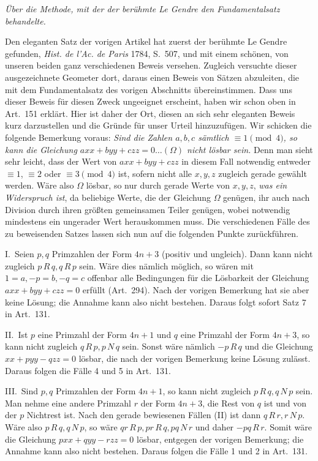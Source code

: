 \begin{center}\itshape Über die Methode, mit der der berühmte Le Gendre den Fundamentalsatz behandelte.\end{center}
Den eleganten Satz der vorigen Artikel hat zuerst der
berühmte Le Gendre gefunden, \emph{Hist. de l'Ac. de Paris}
1784, S.\ 507, und mit einem schönen, von unseren beiden
ganz verschiedenen Beweis versehen. Zugleich versuchte
dieser ausgezeichnete Geometer dort, daraus einen Beweis
von Sätzen abzuleiten, die mit dem Fundamentalsatz
des vorigen Abschnitts übereinstimmen. Dass uns dieser
Beweis für diesen Zweck ungeeignet erscheint, haben wir
schon oben in Art.\ 151 erklärt. Hier ist daher der Ort,
diesen an sich sehr eleganten Beweis kurz darzustellen
und die Gründe für unser Urteil hinzuzufügen. Wir schicken
die folgende Bemerkung voraus: \emph{Sind die Zahlen
\(a,b,c\) sämtlich \(\equiv1\pmod4\), so kann die Gleichung \(axx+byy+czz=0\ldots(\Omega)\)
nicht lösbar sein.} Denn man sieht sehr leicht, dass der
Wert von \(axx+byy+czz\) in diesem Fall notwendig entweder
\(\equiv1\), \(\equiv2\) oder \(\equiv3\pmod4\) ist, sofern nicht alle
\(x,y,z\) zugleich gerade gewählt werden. Wäre also
\(\Omega\) lösbar, so nur durch gerade Werte von \(x,y,z\),
\emph{was ein Widerspruch ist}, da beliebige Werte, die der
Gleichung \(\Omega\) genügen, ihr auch nach Division durch
ihren größten gemeinsamen Teiler genügen, wobei notwendig
mindestens ein ungerader Wert herauskommen muss. Die
verschiedenen Fälle des zu beweisenden Satzes lassen
sich nun auf die folgenden Punkte zurückführen.

I.\ Seien \(p,q\) Primzahlen der Form \(4n+3\) (positiv
und ungleich). Dann kann nicht zugleich \(p\,R\,q,q\,R\,p\) sein.
Wäre dies nämlich möglich, so wären mit \(1=a,-p=b,-q=c\) offenbar
alle Bedingungen für die Lösbarkeit der Gleichung \(axx+byy+czz=0\)
erfüllt (Art.\ 294). Nach der vorigen Bemerkung hat sie
aber keine Lösung; die Annahme kann also nicht bestehen.
Daraus folgt sofort Satz 7 in Art.\ 131.

II.\ Ist \(p\) eine Primzahl der Form \(4n+1\) und
\(q\) eine Primzahl der Form \(4n+3\), so kann nicht
zugleich \(q\,R\,p,p\,N\,q\) sein. Sonst wäre nämlich \(-p\,R\,q\) und
die Gleichung \(xx+pyy-qzz=0\) lösbar, die nach der vorigen
Bemerkung keine Lösung zulässt. Daraus folgen die Fälle
4 und 5 in Art.\ 131.

III.\ Sind \(p,q\) Primzahlen der Form \(4n+1\), so
kann nicht zugleich \(p\,R\,q,q\,N\,p\) sein. Man nehme eine andere
Primzahl \(r\) der Form \(4n+3\), die Rest von \(q\)
ist und von der \(p\) Nichtrest ist. Nach den gerade
bewiesenen Fällen (II) ist dann \(q\,R\,r,r\,N\,p\). Wäre also
\(p\,R\,q,q\,N\,p\), so wäre \(qr\,R\,p,pr\,R\,q,pq\,N\,r\) und daher \(-pq\,R\,r\). Somit
wäre die Gleichung \(pxx+qyy-rzz=0\) lösbar, entgegen der vorigen
Bemerkung; die Annahme kann also nicht bestehen. Daraus
folgen die Fälle 1 und 2 in Art.\ 131.

